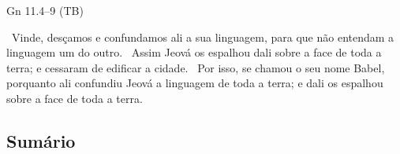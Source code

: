 \documentclass[12pt,aspectratio=169]{beamer}
\newcommand{\ver}[1]{%
    \raisebox{0.50ex}{%
        \scalebox{1.1}{%
            \pmb{\textbf{\textcolor{BSpbg}{#1}}}%
        }%
    }%
}
\newcommand{\QUOTE}[1]{%
    \par\noindent\hspace*{0.05\linewidth}%
    \begin{minipage}{0.9\linewidth}%
        \linespread{1.35}\large{#1}%
    \end{minipage}%
}
\newcommand{\YEL}[1]{{\textcolor{TXyel}{#1}}}
\begin{document}
    \begin{frame}{Gn 11.4--9 (TB)}
        \QUOTE{%
            \ver{7}~Vinde, desçamos e confundamos ali a sua linguagem, para que não entendam a
            linguagem um do outro.
            \ver{8}~Assim Jeová os \YEL{espalhou dali} sobre a face de toda a terra; e cessaram
            de edificar a cidade.
            \ver{9}~Por isso, se chamou o seu nome \YEL{Babel}, porquanto ali \YEL{confundiu}
            Jeová a linguagem de toda a terra; e dali os \YEL{espalhou} sobre a face de toda a
            terra.
        }
    \end{frame}

    \subsection{Sumário}
\end{document}
